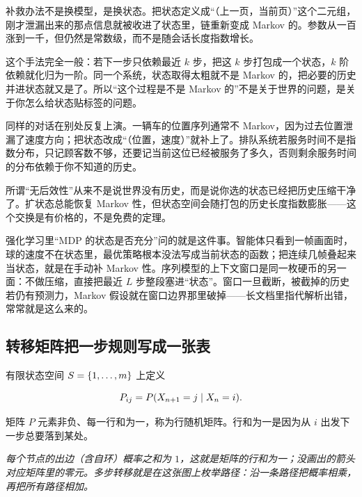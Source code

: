 补救办法不是换模型，是换状态。把状态定义成``（上一页，当前页）''这个二元组，刚才泄漏出来的那点信息就被收进了状态里，链重新变成 Markov 的。参数从一百涨到一千，但仍然是常数级，而不是随会话长度指数增长。

这个手法完全一般：若下一步只依赖最近 \(k\) 步，把这 \(k\) 步打包成一个状态，\(k\) 阶依赖就化归为一阶。同一个系统，状态取得太粗就不是 Markov 的，把必要的历史并进状态就又是了。所以``这个过程是不是 Markov 的''不是关于世界的问题，是关于你怎么给状态贴标签的问题。

同样的对话在别处反复上演。一辆车的位置序列通常不 Markov，因为过去位置泄漏了速度方向；把状态改成``（位置，速度）''就补上了。排队系统若服务时间不是指数分布，只记顾客数不够，还要记当前这位已经被服务了多久，否则剩余服务时间的分布依赖于你不知道的历史。

\begin{remark}
所谓``无后效性''从来不是说世界没有历史，而是说你选的状态已经把历史压缩干净了。扩状态总能恢复 Markov 性，但状态空间会随打包的历史长度指数膨胀——这个交换是有价格的，不是免费的定理。
\end{remark}

强化学习里``MDP 的状态是否充分''问的就是这件事。智能体只看到一帧画面时，球的速度不在状态里，最优策略根本没法写成当前状态的函数；把连续几帧叠起来当状态，就是在手动补 Markov 性。序列模型的上下文窗口是同一枚硬币的另一面：不做压缩，直接把最近 \(L\) 步整段塞进``状态''。窗口一旦截断，被截掉的历史若仍有预测力，Markov 假设就在窗口边界那里破掉——长文档里指代解析出错，常常就是这么来的。

\subsection{转移矩阵把一步规则写成一张表}

有限状态空间 \(S=\left\{1,\ldots,m\right\}\) 上定义

\[
P_{ij}=P(X_{n+1}=j\mid X_n=i).
\]

矩阵 \(P\) 元素非负、每一行和为一，称为行随机矩阵。行和为一是因为从 \(i\) 出发下一步总要落到某处。

\begin{center}

\emph{每个节点的出边（含自环）概率之和为 \(1\)，这就是矩阵的行和为一；没画出的箭头对应矩阵里的零元。多步转移就是在这张图上枚举路径：沿一条路径把概率相乘，再把所有路径相加。}
\end{center}


